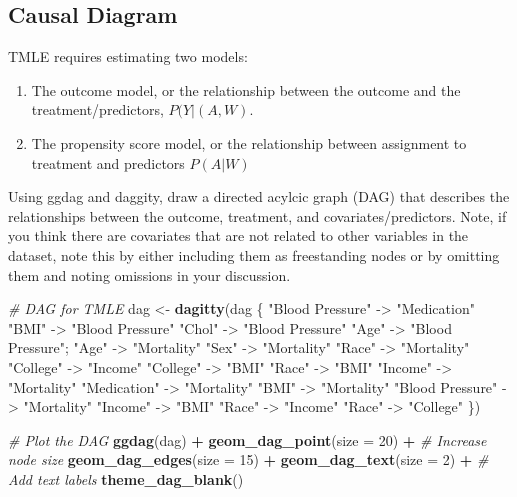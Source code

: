 \documentclass[
]{article}
\newenvironment{Shaded}{\begin{snugshade}}{\end{snugshade}}
\newcommand{\AttributeTok}[1]{\textcolor[rgb]{0.13,0.29,0.53}{#1}}
\newcommand{\CommentTok}[1]{\textcolor[rgb]{0.56,0.35,0.01}{\textit{#1}}}
\newcommand{\DecValTok}[1]{\textcolor[rgb]{0.00,0.00,0.81}{#1}}
\newcommand{\FunctionTok}[1]{\textcolor[rgb]{0.13,0.29,0.53}{\textbf{#1}}}
\newcommand{\NormalTok}[1]{#1}
\newcommand{\OtherTok}[1]{\textcolor[rgb]{0.56,0.35,0.01}{#1}}
\newcommand{\SpecialCharTok}[1]{\textcolor[rgb]{0.81,0.36,0.00}{\textbf{#1}}}
\newcommand{\StringTok}[1]{\textcolor[rgb]{0.31,0.60,0.02}{#1}}
\begin{document}
\hypertarget{causal-diagram}{%
\subsection{Causal Diagram}\label{causal-diagram}}

TMLE requires estimating two models:

\begin{enumerate}
    \item The outcome model, or the relationship between the outcome and the treatment/predictors, $P(Y|(A,W)$.
    \item The propensity score model, or the relationship between assignment to treatment and predictors $P(A|W)$
\end{enumerate}

Using ggdag and daggity, draw a directed acylcic graph (DAG) that
describes the relationships between the outcome, treatment, and
covariates/predictors. Note, if you think there are covariates that are
not related to other variables in the dataset, note this by either
including them as freestanding nodes or by omitting them and noting
omissions in your discussion.

\begin{Shaded}
\begin{Highlighting}[]
\CommentTok{\# DAG for TMLE}
\NormalTok{dag }\OtherTok{\textless{}{-}} \FunctionTok{dagitty}\NormalTok{(}\StringTok{\textquotesingle{}dag \{}
\StringTok{  "Blood Pressure" {-}\textgreater{} "Medication"}
\StringTok{  "BMI" {-}\textgreater{} "Blood Pressure"}
\StringTok{  "Chol" {-}\textgreater{} "Blood Pressure"}
\StringTok{  "Age" {-}\textgreater{} "Blood Pressure"; "Age" {-}\textgreater{} "Mortality"}
\StringTok{  "Sex" {-}\textgreater{} "Mortality"}
\StringTok{  "Race" {-}\textgreater{} "Mortality"}
\StringTok{  "College" {-}\textgreater{} "Income"}
\StringTok{  "College" {-}\textgreater{} "BMI"}
\StringTok{  "Race" {-}\textgreater{} "BMI"}
\StringTok{  "Income" {-}\textgreater{} "Mortality"}
\StringTok{  "Medication" {-}\textgreater{} "Mortality"}
\StringTok{  "BMI" {-}\textgreater{} "Mortality"}
\StringTok{  "Blood Pressure" {-}\textgreater{} "Mortality"}
\StringTok{  "Income" {-}\textgreater{} "BMI"}
\StringTok{  "Race" {-}\textgreater{} "Income"}
\StringTok{  "Race" {-}\textgreater{} "College"}
\StringTok{\}\textquotesingle{}}\NormalTok{)}

\CommentTok{\# Plot the DAG}
\FunctionTok{ggdag}\NormalTok{(dag) }\SpecialCharTok{+}
  \FunctionTok{geom\_dag\_point}\NormalTok{(}\AttributeTok{size =} \DecValTok{20}\NormalTok{) }\SpecialCharTok{+}  \CommentTok{\# Increase node size}
  \FunctionTok{geom\_dag\_edges}\NormalTok{(}\AttributeTok{size =} \DecValTok{15}\NormalTok{) }\SpecialCharTok{+}
  \FunctionTok{geom\_dag\_text}\NormalTok{(}\AttributeTok{size =} \DecValTok{2}\NormalTok{) }\SpecialCharTok{+}  \CommentTok{\# Add text labels}
  \FunctionTok{theme\_dag\_blank}\NormalTok{()}
\end{Highlighting}
\end{Shaded}
\end{document}
